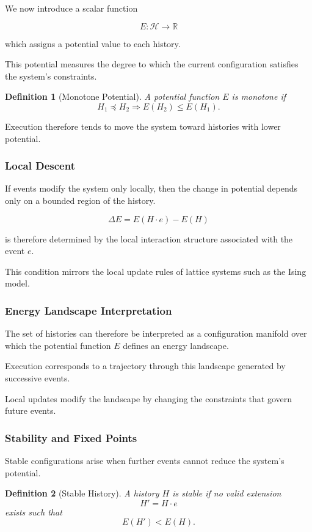 \documentclass[12pt]{article}
\newtheorem{definition}{Definition}
\begin{document}
We now introduce a scalar function

\[
E : \mathcal{H} \rightarrow \mathbb{R}
\]

which assigns a potential value to each history.

This potential measures the degree to which
the current configuration satisfies the system's
constraints.

\begin{definition}[Monotone Potential]
A potential function $E$ is monotone if
\[
H_1 \preceq H_2 \Rightarrow E(H_2) \leq E(H_1).
\]
\end{definition}

Execution therefore tends to move the system toward
histories with lower potential.

\subsubsection{Local Descent}

If events modify the system only locally,
then the change in potential depends only
on a bounded region of the history.

\[
\Delta E = E(H \cdot e) - E(H)
\]

is therefore determined by the local interaction
structure associated with the event $e$.

This condition mirrors the local update rules
of lattice systems such as the Ising model.

\subsubsection{Energy Landscape Interpretation}

The set of histories can therefore be interpreted
as a configuration manifold over which the potential
function $E$ defines an energy landscape.

Execution corresponds to a trajectory through this
landscape generated by successive events.

Local updates modify the landscape by changing
the constraints that govern future events.

\subsubsection{Stability and Fixed Points}

Stable configurations arise when further events
cannot reduce the system's potential.

\begin{definition}[Stable History]
A history $H$ is stable if no valid extension
\[
H' = H \cdot e
\]
exists such that
\[
E(H') < E(H).
\]
\end{definition}
\end{document}
